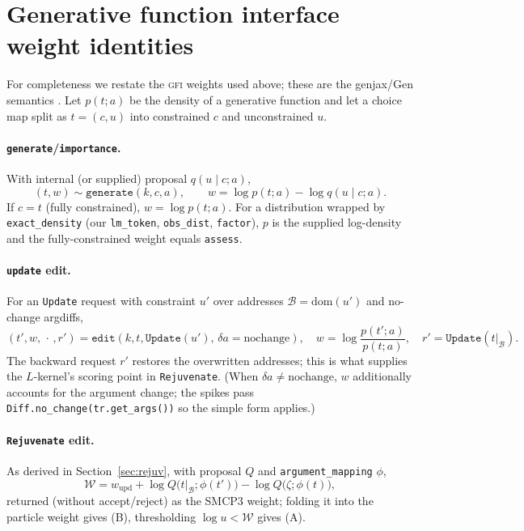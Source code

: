 \documentclass[11pt]{article}
\newcommand{\GFI}{\textsc{gfi}}
\newcommand{\given}{\mid}
\newcommand{\code}[1]{\texttt{#1}}
\begin{document}
\appendix
\section{Generative function interface weight identities}
\label{app:gfi}

For completeness we restate the \GFI{} weights used above; these are the genjax/Gen semantics
\cite{genjax,gen}. Let $p(t;a)$ be the density of a generative function and let a choice map split as
$t = (c, u)$ into constrained $c$ and unconstrained $u$.

\paragraph{\texttt{generate}/\texttt{importance}.} With internal (or supplied) proposal $q(u\given c;a)$,
\[
  (t,w)\sim\code{generate}(k,c,a),\qquad
  w = \log p(t;a) - \log q(u\given c;a).
\]
If $c=t$ (fully constrained), $w=\log p(t;a)$. For a distribution wrapped by \code{exact\_density}
(our \code{lm\_token}, \code{obs\_dist}, \code{factor}), $p$ is the supplied log-density and the
fully-constrained weight equals \code{assess}.

\paragraph{\texttt{update} edit.} For an \code{Update} request with constraint $u'$ over addresses
$\mathcal B=\mathrm{dom}(u')$ and no-change argdiffs,
\[
  (t',w,\,\cdot\,,r')=\code{edit}(k,t,\code{Update}(u'),\,\delta a{=}\mathrm{nochange}),
  \quad w=\log\frac{p(t';a)}{p(t;a)},\quad r'=\code{Update}(t|_{\mathcal B}).
\]
The backward request $r'$ restores the overwritten addresses; this is what supplies the $L$-kernel's
scoring point in \code{Rejuvenate}. (When $\delta a\ne\mathrm{nochange}$, $w$ additionally accounts
for the argument change; the spikes pass \code{Diff.no\_change(tr.get\_args())} so the simple form
applies.)

\paragraph{\texttt{Rejuvenate} edit.} As derived in Section~\ref{sec:rejuv}, with proposal $Q$ and
\code{argument\_mapping} $\phi$,
\[
  \mathcal W = w_{\mathrm{upd}} + \log Q\big(t|_{\mathcal B};\phi(t')\big) - \log Q\big(\zeta;\phi(t)\big),
\]
returned (without accept/reject) as the SMCP3 weight; folding it into the particle weight gives (B),
thresholding $\log u<\mathcal W$ gives (A).
\end{document}
